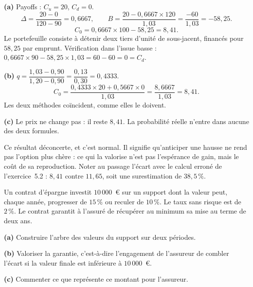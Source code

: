 \begin{corrige}
\textbf{(a)} Payoffs : $C_u = 20$, $C_d = 0$.
\[
  \Delta = \frac{20-0}{120-90} = 0{,}6667,
  \qquad
  B = \frac{20 - 0{,}6667 \times 120}{1{,}03} = \frac{-60}{1{,}03} = -58{,}25 .
\]
\[
  C_0 = 0{,}6667 \times 100 - 58{,}25 = 8{,}41 .
\]
Le portefeuille consiste à détenir deux tiers d'unité de sous-jacent, financés
pour $58{,}25$ par emprunt. Vérification dans l'issue basse :
$0{,}6667 \times 90 - 58{,}25 \times 1{,}03 = 60 - 60 = 0 = C_d$.

\medskip
\textbf{(b)} $q = \dfrac{1{,}03 - 0{,}90}{1{,}20-0{,}90} = \dfrac{0{,}13}{0{,}30} = 0{,}4333$.
\[
  C_0 = \frac{0{,}4333 \times 20 + 0{,}5667 \times 0}{1{,}03} = \frac{8{,}6667}{1{,}03} = 8{,}41 .
\]
Les deux méthodes coïncident, comme elles le doivent.

\medskip
\textbf{(c)} Le prix ne change pas : il reste $8{,}41$. La probabilité réelle
n'entre dans aucune des deux formules.

\medskip
Ce résultat déconcerte, et c'est normal. Il signifie qu'anticiper une hausse ne
rend pas l'option plus chère : ce qui la valorise n'est pas l'espérance de gain,
mais le coût de sa reproduction. Noter au passage l'écart avec le calcul erroné
de l'exercice~5.2 : $8{,}41$ contre $11{,}65$, soit une surestimation de $38{,}5\,\%$.
\end{corrige}

\begin{exercice}
Un contrat d'épargne investit $10\,000$~\euro{} sur un support dont la valeur
peut, chaque année, progresser de $15\,\%$ ou reculer de $10\,\%$. Le taux sans
risque est de $2\,\%$. Le contrat garantit à l'assuré de récupérer au minimum sa
mise au terme de deux ans.

\textbf{(a)} Construire l'arbre des valeurs du support sur deux périodes.

\textbf{(b)} Valoriser la garantie, c'est-à-dire l'engagement de l'assureur de
combler l'écart si la valeur finale est inférieure à $10\,000$~\euro.

\textbf{(c)} Commenter ce que représente ce montant pour l'assureur.
\end{exercice}

